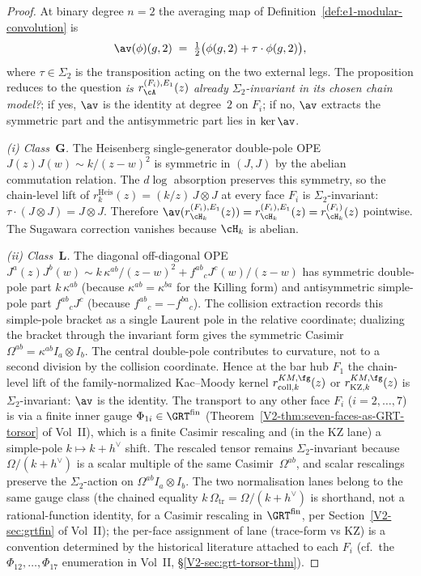 \begin{proof}
At binary degree $n = 2$ the averaging map of
Definition~\ref{def:e1-modular-convolution} is
\[
 \av(\phi)(g, 2) \;=\; \tfrac{1}{2}\bigl(\phi(g,2) +
 \tau \cdot \phi(g,2)\bigr),
\]
where $\tau \in \Sigma_2$ is the transposition acting on the
two external legs. The proposition reduces to the question
\emph{is $r_\cA^{(F_i),E_1}(z)$ already $\Sigma_2$-invariant
in its chosen chain model?}; if yes, $\av$ is the identity
at degree~$2$ on $F_i$; if no, $\av$ extracts the symmetric part
and the antisymmetric part lies in $\ker\av$.

\smallskip
\emph{(i) Class~$\mathbf{G}$.} The Heisenberg single-generator
double-pole OPE $J(z)J(w) \sim k/(z-w)^2$ is symmetric in
$(J, J)$ by the abelian commutation relation. The $d\log$
absorption preserves this symmetry, so the chain-level lift
of $r^{\mathrm{Heis}}_k(z) = (k/z)\,J\otimes J$ at every face $F_i$ is
$\Sigma_2$-invariant: $\tau \cdot (J\otimes J) = J\otimes J$.
Therefore $\av(r^{(F_i),E_1}_{\cH_k}(z)) = r^{(F_i),E_1}_{\cH_k}(z)
= r_{\cH_k}^{(F_i)}(z)$ pointwise. The Sugawara correction
vanishes because $\cH_k$ is abelian.

\smallskip
\emph{(ii) Class~$\mathbf{L}$.} The diagonal off-diagonal
OPE $J^a(z)J^b(w) \sim k\,\kappa^{ab}/(z-w)^2 + f^{ab}{}_c
J^c(w)/(z-w)$ has symmetric double-pole part
$k\,\kappa^{ab}$ (because $\kappa^{ab} = \kappa^{ba}$ for the
Killing form) and antisymmetric simple-pole part
$f^{ab}{}_c J^c$ (because $f^{ab}{}_c = -f^{ba}{}_c$). The
collision extraction records this simple-pole bracket as a single
Laurent pole in the relative coordinate; dualizing the bracket
through the invariant form gives the symmetric Casimir
$\Omega^{ab} = \kappa^{ab} I_a \otimes I_b$. The central double-pole
contributes to curvature, not to a second division by the collision
coordinate. Hence at the bar hub $F_1$ the chain-level lift of the
family-normalized Kac--Moody kernel
$r^{KM,\fg}_{\mathrm{coll},k}(z)$ or
$r^{KM,\fg}_{\mathrm{KZ},k}(z)$ is
$\Sigma_2$-invariant: $\av$ is the identity. The transport
to any other face $F_i$ ($i = 2, \ldots, 7$) is via a finite
inner gauge $\Phi_{1i} \in \GRT^{\mathrm{fin}}$
(Theorem~\ref{V2-thm:seven-faces-as-GRT-torsor} of Vol~II), which
is a finite Casimir rescaling and (in the KZ lane) a simple-pole
$k \mapsto k+h^\vee$ shift. The rescaled tensor remains
$\Sigma_2$-invariant because $\Omega/(k+h^\vee)$ is a scalar
multiple of the same Casimir~$\Omega^{ab}$, and scalar
rescalings preserve the $\Sigma_2$-action on
$\Omega^{ab} I_a \otimes I_b$. The two normalisation lanes belong
to the same gauge class (the chained equality
$k\,\Omega_{\mathrm{tr}} = \Omega/(k+h^\vee)$ is shorthand, not a
rational-function identity, for a Casimir rescaling
in $\GRT^{\mathrm{fin}}$, per
Section~\ref{V2-sec:grtfin} of Vol~II); the per-face assignment of
lane (trace-form vs KZ) is a convention determined by the
historical literature attached to each $F_i$ (cf.\ the
$\Phi_{12}, \dots, \Phi_{17}$ enumeration in Vol~II,
\S\ref{V2-sec:grt-torsor-thm}).


\end{proof}
